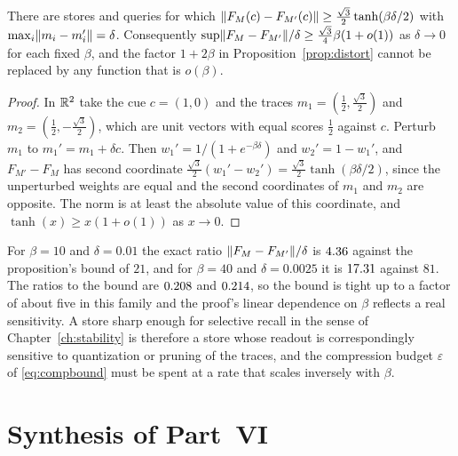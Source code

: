 \begin{extension}\label{ext:sharp30}
There are stores and queries for which $\lVert F_M(c)-F_{M'}(c)\rVert\ge\tfrac{\sqrt3}{2}\tanh(\beta\delta/2)$ with $\max_i\lVert m_i-m_i'\rVert=\delta$. Consequently $\sup\lVert F_M-F_{M'}\rVert/\delta\ge\tfrac{\sqrt3}{4}\beta(1+o(1))$ as $\delta\to0$ for each fixed $\beta$, and the factor $1+2\beta$ in Proposition~\ref{prop:distort} cannot be replaced by any function that is $o(\beta)$.
\end{extension}

\begin{proof}
In $\mathbb{R}^2$ take the cue $c=(1,0)$ and the traces $m_1=(\tfrac12,\tfrac{\sqrt3}2)$ and $m_2=(\tfrac12,-\tfrac{\sqrt3}2)$, which are unit vectors with equal scores $\tfrac12$ against $c$. Perturb $m_1$ to $m_1'=m_1+\delta c$. Then $w_1'=1/(1+e^{-\beta\delta})$ and $w_2'=1-w_1'$, and $F_{M'}-F_M$ has second coordinate $\tfrac{\sqrt3}2(w_1'-w_2')=\tfrac{\sqrt3}2\tanh(\beta\delta/2)$, since the unperturbed weights are equal and the second coordinates of $m_1$ and $m_2$ are opposite. The norm is at least the absolute value of this coordinate, and $\tanh(x)\ge x(1+o(1))$ as $x\to0$.
\end{proof}

For $\beta=10$ and $\delta=0.01$ the exact ratio $\lVert F_M-F_{M'}\rVert/\delta$ is $4.36$ against the proposition's bound of $21$, and for $\beta=40$ and $\delta=0.0025$ it is $17.31$ against $81$. The ratios to the bound are $0.208$ and $0.214$, so the bound is tight up to a factor of about five in this family and the proof's linear dependence on $\beta$ reflects a real sensitivity. A store sharp enough for selective recall in the sense of Chapter~\ref{ch:stability} is therefore a store whose readout is correspondingly sensitive to quantization or pruning of the traces, and the compression budget $\varepsilon$ of \eqref{eq:compbound} must be spent at a rate that scales inversely with $\beta$.

\section*{Synthesis of Part~VI}\label{sec:synth6}

